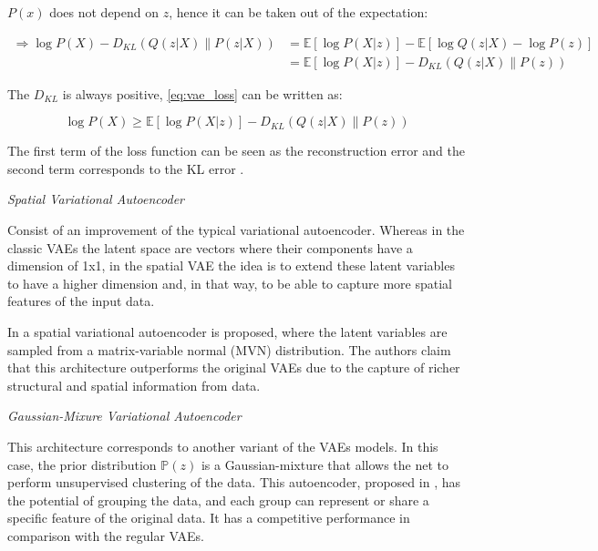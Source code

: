 \begin{math}P(x)\end{math} does not depend on \begin{math}z\end{math}, hence it can be taken out of the expectation:

\begin{equation}
 \begin{aligned} \Longrightarrow \log P(X)-D_{KL}(Q(z | X) \| P(z | X)) &=\mathbb{E}[\log P(X | z)]-\mathbb{E}[\log Q(z | X)-\log P(z)] \\ &=\mathbb{E}[\log P(X | z)]-D_{KL}(Q(z | X) \| P(z)) \end{aligned}
 \label{eq:vae_loss}
\end{equation}

The \begin{math}D_{KL}\end{math} is always positive, \ref{eq:vae_loss} can be written as:

\begin{equation}
 \log P(X) \geq \mathbb{E}[\log P(X | z)]-D_{KL}(Q(z | X) \| P(z))
 \label{eq:ineq}
\end{equation}

The first term of the loss function can be seen as the reconstruction error and the second term corresponds to the KL error \cite{Doersch2016}.

\textit{Spatial Variational Autoencoder}

Consist of an improvement of the typical variational autoencoder. Whereas in the classic VAEs the latent space are vectors where their components have a dimension of 1x1, in the spatial VAE the idea is to extend these latent variables to have a higher dimension and, in that way, to be able to capture more spatial features of the input data.

In \cite{Wang2019} a spatial variational autoencoder is proposed, where the latent variables are sampled from a matrix-variable normal (MVN) distribution. The authors claim that this architecture outperforms the original VAEs due to the capture of richer structural and spatial information from data.

\textit{Gaussian-Mixure Variational Autoencoder}

This architecture corresponds to another variant of the VAEs models. In this case, the prior distribution \begin{math}\mathbb{P}(z)\end{math} is a Gaussian-mixture that allows the net to perform unsupervised clustering of the data. This autoencoder, proposed in \cite{Dilokthanakul2016}, has the potential of grouping the data, and each group can represent or share a specific feature of the original data. It has a competitive performance in comparison with the regular VAEs.

